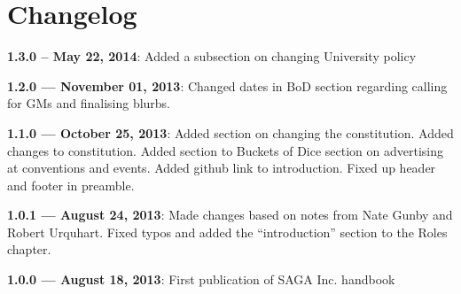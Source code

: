 \chapter*{Changelog}

\textbf{1.3.0 -- May 22, 2014}: Added a subsection on changing University policy

\textbf{1.2.0 --- November 01, 2013}: Changed dates in BoD section regarding calling for GMs and finalising blurbs.

\textbf{1.1.0 --- October 25, 2013}: Added section on changing the constitution. Added changes to constitution. Added section to Buckets of Dice section on advertising at conventions and events. Added github link to introduction. Fixed up header and footer in preamble.

\textbf{1.0.1 --- August 24, 2013}: Made changes based on notes from Nate Gunby and Robert Urquhart. Fixed typos and added the ``introduction'' section to the Roles chapter.

\textbf{1.0.0 --- August 18, 2013}: First publication of SAGA Inc. handbook